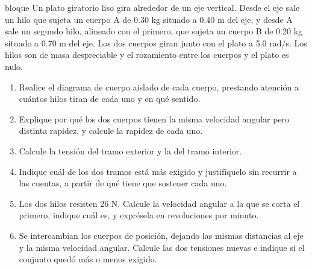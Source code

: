 \documentclass[11pt,openany]{book}
\begin{document}
\begin{ejercicio}{bloque}
Un plato giratorio liso gira alrededor de un eje vertical. Desde el eje sale un hilo que sujeta un cuerpo A de 0.30 kg situado a 0.40 m del eje, y desde A sale un segundo hilo, alineado con el primero, que sujeta un cuerpo B de 0.20 kg situado a 0.70 m del eje. Los dos cuerpos giran junto con el plato a 5.0 rad/s. Los hilos son de masa despreciable y el rozamiento entre los cuerpos y el plato es nulo.
\begin{enumerate}[label=(\alph*), leftmargin=1.7em, itemsep=1pt, topsep=3pt]
  \item Realice el diagrama de cuerpo aislado de cada cuerpo, prestando atención a cuántos hilos tiran de cada uno y en qué sentido.
  \item Explique por qué los dos cuerpos tienen la misma velocidad angular pero distinta rapidez, y calcule la rapidez de cada uno.
  \item Calcule la tensión del tramo exterior y la del tramo interior.
  \item Indique cuál de los dos tramos está más exigido y justifíquelo sin recurrir a las cuentas, a partir de qué tiene que sostener cada uno.
  \item Los dos hilos resisten 26 N. Calcule la velocidad angular a la que se corta el primero, indique cuál es, y exprésela en revoluciones por minuto.
  \item Se intercambian los cuerpos de posición, dejando las mismas distancias al eje y la misma velocidad angular. Calcule las dos tensiones nuevas e indique si el conjunto quedó más o menos exigido.
\end{enumerate}
\end{ejercicio}
\end{document}
